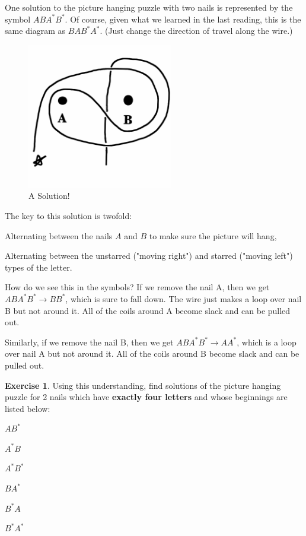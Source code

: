 \documentclass[12pt,letterpaper]{article}
\theoremstyle{definition}
\newtheorem{exercise}[question]{Exercise}
\begin{document}
One solution to the picture hanging puzzle with two nails is represented by the symbol $ABA^*B^*$. Of course, given what we learned in the last reading, this is the same diagram as $BAB^*A^*$. (Just change the direction of travel along the wire.)
\begin{figure}[h]
\centering
\includegraphics[height=2.5in]{rgp03pics/ABAsBs.png}
\caption{A Solution!}
\end{figure}
The key to this solution is twofold:
\begin{compactitem}
\item Alternating between the nails $A$ and $B$ to make sure the picture will hang,
\item Alternating between the unstarred ("moving right") and starred ("moving left") types of the letter.
\end{compactitem}
How do we see this in the symbols? 
If we remove the nail A, then we get $ABA^*B^* \longrightarrow BB^*$, which is sure to fall down. 
The wire just makes a loop over nail B but not around it.  
All of the coils around A become slack and can be pulled out.

Similarly, if we remove the nail B, then we get $ABA^*B^* \longrightarrow AA^*$, which is a loop over nail A but not around it. 
All of the coils around B become slack and can be pulled out.

\begin{exercise}
Using this understanding, find solutions of the picture hanging puzzle for 2 nails which have \textbf{exactly four letters} and whose beginnings are listed below:
\begin{compactitem}
\begin{multicols}{3}
\item $AB^*$
\item $A^*B$
\item $A^*B^*$
\item $BA^*$
\item $B^*A$
\item $B^*A^*$
\end{multicols}
\end{compactitem}
\end{exercise}
\end{document}
